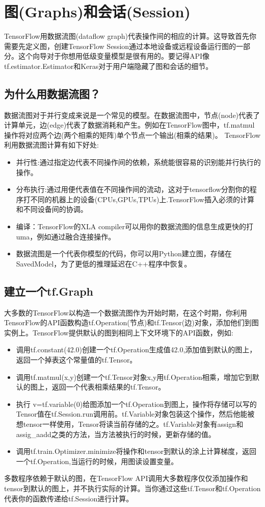 \section{图(Graphs)和会话(Session)}
TensorFlow用数据流图(dataflow graph)代表操作间的相应的计算。这导致首先你需要先定义图，创建TensorFlow Session通过本地设备或远程设备运行图的一部分。这个向导对于你想用低级变量模型是很有用的。要记得API像tf.estimator.Estimator和Keras对于用户端隐藏了图和会话的细节。
\subsection{为什么用数据流图？}
数据流图对于并行变成来说是一个常见的模型。在数据流图中，节点(node)代表了计算单元，边(edge)代表了数据消耗和产生。例如在TensorFlow图中，tf.matmul操作将对应两个边(两个相乘的矩阵)单个节点一个输出(相乘的结果)。
TensorFlow利用数据流图计算有如下好处:
\begin{itemize}
\item 并行性:通过指定边代表不同操作间的依赖，系统能很容易的识别能并行执行的操作。
\item 分布执行:通过用便代表值在不同操作间的流动，这对于tensorflow分割你的程序打不同的机器上的设备(CPUs,GPUs,TPUs)上.TensorFlow插入必须的计算和不同设备间的协调。
\item 编译：TensorFlow的XLA compiler可以用你的数据流图的信息生成更快的打uma，例如通过融合连接操作。
\item 数据流图是一个代表你模型的代码，你可以用Python建立图，存储在SavedModel，为了更低的推理延迟在C++程序中恢复。
\end{itemize}
\subsection{建立一个tf.Graph}
大多数的TensorFlow以构造一个数据流图作为开始时期，在这个时期，你利用TensorFlow的API函数构造tf.Operation(节点)和tf.Tensor(边)对象，添加他们到图实例上。TensorFlow提供默认的图到相同上下文环境下的API函数，例如:
\begin{itemize}
\item 调用tf.constant(42.0)创建一个tf.Operation生成值42.0,添加值到默认的图上，返回一个掉表这个常量值的tf.Tensor。
\item 调用tf.matmul(x,y)创建一个tf.Tensor对象x,y用tf.Operation相乘，增加它到默认的图上，返回一个代表相乘结果的tf.Tensor。
\item 执行 v=tf.variable(0)给图添加一个tf.Operation到图上，操作将存储可以写的Tensor值在tf.Session.run调用前。tf.Variable对象包装这个操作，然后他能被想tensor一样使用，Tensor将读当前存储的之。tf.Variable对象有assign和assig\_aadd之类的方法，当方法被执行的时候，更新存储的值。
\item 调用tf.train.Optimizer.minimize将操作和tensor到默认的涂上计算梯度，返回一个tf.Operation,当运行的时候，用图读设置变量。
\end{itemize}
多数程序依赖于默认的图，在TensorFlow API调用大多数程序仅仅添加操作和tensor到默认的图上，并不执行实际的计算。当你通过这些tf.Tensor和tf.Operation代表你的函数传递给tf.Session进行计算。
